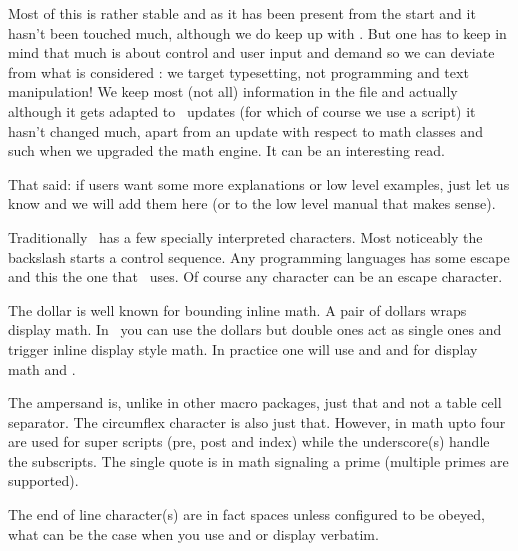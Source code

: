 Most of this is rather stable and as it has been present from the start and it
hasn't been touched much, although we do keep up with \UNICODE. But one has to
keep in mind that much is about control and user input and demand so we can
deviate from what is considered : we target typesetting, not
programming and text manipulation! We keep most (not all) information in the
 file and actually although it gets adapted to \UNICODE\
updates (for which of course we use a script) it hasn't changed much, apart from
an update with respect to math classes and such when we upgraded the math engine.
It can be an interesting read.

That said: if users want some more explanations or low level examples, just let
us know and we will add them here (or to the low level manual that makes sense).


\stopsectionlevel

\startsectionlevel[title=Specials]

Traditionally \TEX\ has a few specially interpreted characters. Most noticeably
the backslash starts a control sequence. Any programming languages has some
escape and this the one that \TEX\ uses. Of course any character can be an escape
character.

The dollar is well known for bounding inline math. A pair of dollars wraps
display math. In \CONTEXT\ you can use the dollars but double ones act as single ones
and trigger inline display style math. In practice one will use \type {\im {...}} and 
and for display math \typ {\startformula} and \typ {\stopformula}.

The ampersand is, unlike in other macro packages, just that and not a table cell
separator. The circumflex character is also just that. However, in math upto four
are used for super scripts (pre, post and index) while the underscore(s) handle
the subscripts. The single quote is in math signaling a prime (multiple primes
are supported).

The end of line character(s) are in fact spaces unless configured to be obeyed,
what can be the case when you use \typ {\startlines} and \typ {\stoplines} or
display verbatim.


